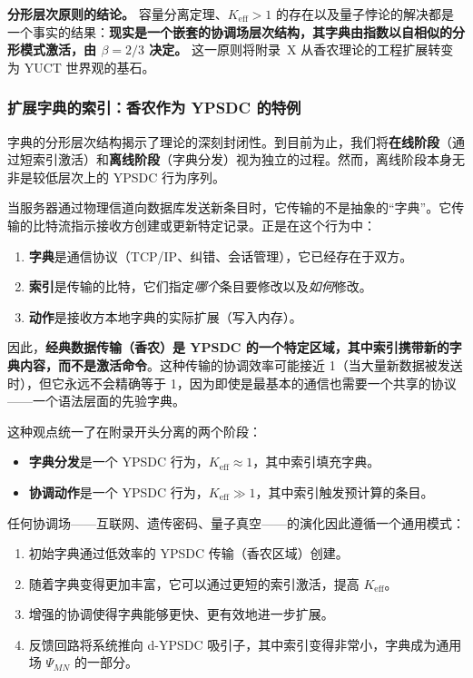 \documentclass[12pt,a4paper]{article}
\theoremstyle{remark}
\begin{document}
	\noindent
	\textbf{分形层次原则的结论。}
	容量分离定理、$K_{\mathrm{eff}}>1$ 的存在以及量子悖论的解决都是一个事实的结果：\textbf{现实是一个嵌套的协调场层次结构，其字典由指数以自相似的分形模式激活，由 $\beta=2/3$ 决定。} 这一原则将附录~X 从香农理论的工程扩展转变为 YUCT 世界观的基石。
	
	\subsubsection{扩展字典的索引：香农作为 YPSDC 的特例}
	
	字典的分形层次结构揭示了理论的深刻封闭性。到目前为止，我们将\textbf{在线阶段}（通过短索引激活）和\textbf{离线阶段}（字典分发）视为独立的过程。然而，离线阶段本身无非是较低层次上的 YPSDC 行为序列。
	
	当服务器通过物理信道向数据库发送新条目时，它传输的不是抽象的“字典”。它传输的比特流指示接收方创建或更新特定记录。正是在这个行为中：
	
	\begin{enumerate}[leftmargin=*]
		\item \textbf{字典}是通信协议（TCP/IP、纠错、会话管理），它已经存在于双方。
		\item \textbf{索引}是传输的比特，它们指定\emph{哪个}条目要修改以及\emph{如何}修改。
		\item \textbf{动作}是接收方本地字典的实际扩展（写入内存）。
	\end{enumerate}
	
	因此，\textbf{经典数据传输（香农）是 YPSDC 的一个特定区域，其中索引携带新的字典内容，而不是激活命令}。这种传输的协调效率可能接近 1（当大量新数据被发送时），但它永远不会精确等于 1，因为即使是最基本的通信也需要一个共享的协议——一个语法层面的先验字典。
	
	这种观点统一了在附录开头分离的两个阶段：
	
	\begin{itemize}[leftmargin=*]
		\item \textbf{字典分发}是一个 YPSDC 行为，$K_{\mathrm{eff}} \approx 1$，其中索引填充字典。
		\item \textbf{协调动作}是一个 YPSDC 行为，$K_{\mathrm{eff}} \gg 1$，其中索引触发预计算的条目。
	\end{itemize}
	
	任何协调场——互联网、遗传密码、量子真空——的演化因此遵循一个通用模式：
	\begin{enumerate}[leftmargin=*]
		\item 初始字典通过低效率的 YPSDC 传输（香农区域）创建。
		\item 随着字典变得更加丰富，它可以通过更短的索引激活，提高 $K_{\mathrm{eff}}$。
		\item 增强的协调使得字典能够更快、更有效地进一步扩展。
		\item 反馈回路将系统推向 d-YPSDC 吸引子，其中索引变得非常小，字典成为通用场 $\Psi_{MN}$ 的一部分。
	\end{enumerate}
	
\end{document}
